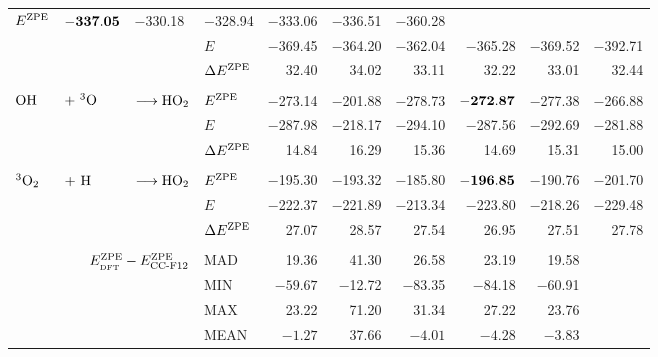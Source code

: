 \begin{table}[htb]
\begin{adjustbox}{width=1.0\textwidth,center}
\begin{tabular}{lll|lDDDDD|r}
    $E^{\text{ZPE}}$ & $\mathbf{-337.05}$ & $-$330.18 & $-$328.94 & $-$333.06 & $-$336.51
    & $-$360.28 \\
      & & & $E$   & $-$369.45 & $-$364.20 & $-$362.04 & $-$365.28 & $-$369.52 & $-$392.71 \\
      & & & $\Delta{E}^{\text{ZPE}}$ & 32.40 & 34.02 & 33.11 & 32.22 & 33.01 & 32.44 \\[2pt]
    \hline
       & & & & & & & & &  \\[-10pt]
    $\text O \text H$&$+\ \tripo$&$\longrightarrow\text H \text O_2$ & $E^{\text{ZPE}}$ & $-$273.14 &
    $-$201.88 & $-$278.73 & $\mathbf{-272.87}$ & $-$277.38 & $-$266.88 \\
      & & & $E$   & $-$287.98 & $-$218.17 & $-$294.10 & $-$287.56 & $-$292.69 & $-$281.88 \\
      & & & $\Delta{E}^{\text{ZPE}}$ & 14.84 & 16.29 & 15.36 & 14.69 & 15.31 & 15.00 \\[2pt]
    \hline
       & & & & & & & & &  \\[-10pt]
    ${^3\text O_2}$&$+\ \te{H}$&$\longrightarrow\text H \text O_2$ & $E^{\text{ZPE}}$ & $-$195.30 &
    $-$193.32 & $-$185.80 & $-\mathbf{196.85}$ & $-$190.76 & $-$201.70 \\
      & & & $E$   & $-$222.37 & $-$221.89 & $-$213.34 & $-$223.80 & $-$218.26 & $-$229.48 \\
      & & & $\Delta{E}^{\text{ZPE}}$ & 27.07 & 28.57 & 27.54 & 26.95 & 27.51 & 27.78 \\[2pt]
     \hline \hline
      & & & & & & & & &  \\[-10pt]
       &
       MAD   & 19.36 & 41.30 & 26.58 & 23.19 & 19.58  &  \\
      & & & MIN   & $-59.67$ & $-$12.72 & $-$83.35 & $-$84.18 & $-$60.91 & \\
      & & & MAX   & 23.22 & 71.20 & 31.34 & 27.22 & 23.76  & \\
      & & & MEAN  & $-1.27$ & 37.66 & $-4.01$ & $-4.28$  & $-3.83$ \\[2pt]
    \end{tabular}%
  \label{Tab:Gas:Reactions}%
\end{adjustbox}
\end{table}%


